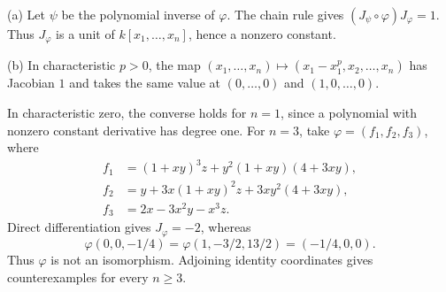 (a) Let $\psi$ be the polynomial inverse of $\varphi$. The chain rule gives $(J_\psi\circ\varphi)J_\varphi=1$. Thus $J_\varphi$ is a unit of $k[x_1,\ldots,x_n]$, hence a nonzero constant.

(b) In characteristic $p>0$, the map $(x_1,\ldots,x_n)\mapsto(x_1-x_1^p,x_2,\ldots,x_n)$ has Jacobian $1$ and takes the same value at $(0,\ldots,0)$ and $(1,0,\ldots,0)$.

In characteristic zero, the converse holds for $n=1$, since a polynomial with nonzero constant derivative has degree one. For $n=3$, take $\varphi=(f_1,f_2,f_3)$, where
\[\begin{aligned}f_1&=(1+xy)^3z+y^2(1+xy)(4+3xy),\\f_2&=y+3x(1+xy)^2z+3xy^2(4+3xy),\\f_3&=2x-3x^2y-x^3z.\end{aligned}\]
Direct differentiation gives $J_\varphi=-2$, whereas
\[\varphi(0,0,-1/4)=\varphi(1,-3/2,13/2)=(-1/4,0,0).\]
Thus $\varphi$ is not an isomorphism. Adjoining identity coordinates gives counterexamples for every $n\ge3$.
